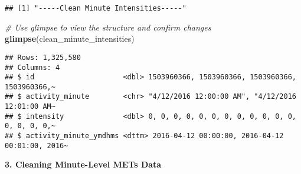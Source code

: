 \documentclass[
]{article}
\newenvironment{Shaded}{\begin{snugshade}}{\end{snugshade}}
\newcommand{\AttributeTok}[1]{\textcolor[rgb]{0.13,0.29,0.53}{#1}}
\newcommand{\CommentTok}[1]{\textcolor[rgb]{0.56,0.35,0.01}{\textit{#1}}}
\newcommand{\FunctionTok}[1]{\textcolor[rgb]{0.13,0.29,0.53}{\textbf{#1}}}
\newcommand{\NormalTok}[1]{#1}
\newcommand{\OtherTok}[1]{\textcolor[rgb]{0.56,0.35,0.01}{#1}}
\newcommand{\SpecialCharTok}[1]{\textcolor[rgb]{0.81,0.36,0.00}{\textbf{#1}}}
\newcommand{\StringTok}[1]{\textcolor[rgb]{0.31,0.60,0.02}{#1}}
\begin{document}
\begin{Shaded}
\end{Shaded}

\begin{verbatim}
## [1] "-----Clean Minute Intensities-----"
\end{verbatim}

\begin{Shaded}
\begin{Highlighting}[]
\CommentTok{\# Use glimpse to view the structure and confirm changes}
\FunctionTok{glimpse}\NormalTok{(clean\_minute\_intensities)}
\end{Highlighting}
\end{Shaded}

\begin{verbatim}
## Rows: 1,325,580
## Columns: 4
## $ id                     <dbl> 1503960366, 1503960366, 1503960366, 1503960366,~
## $ activity_minute        <chr> "4/12/2016 12:00:00 AM", "4/12/2016 12:01:00 AM~
## $ intensity              <dbl> 0, 0, 0, 0, 0, 0, 0, 0, 0, 0, 0, 0, 0, 0, 0, 0,~
## $ activity_minute_ymdhms <dttm> 2016-04-12 00:00:00, 2016-04-12 00:01:00, 2016~
\end{verbatim}

\textbf{3. Cleaning Minute-Level METs Data}
\end{document}
